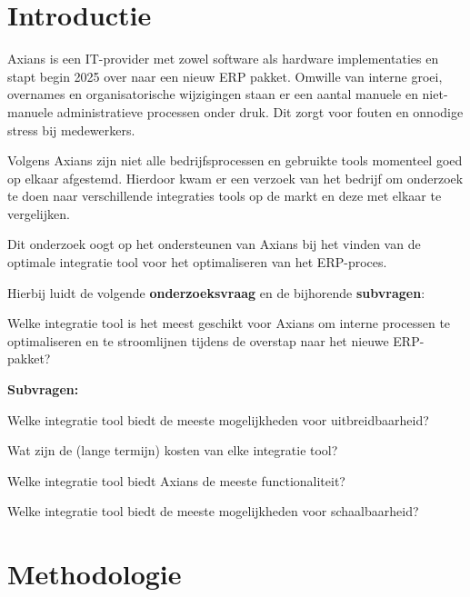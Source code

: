 \documentclass[a0,portrait]{hogent-poster}
\begin{document}
\begin{multicols}{2} %

\section{Introductie}

Axians is een IT-provider met zowel software als hardware implementaties en stapt begin 2025 over naar een nieuw ERP pakket. Omwille van interne groei, overnames en organisatorische wijzigingen staan er een aantal manuele en niet-manuele administratieve processen onder druk. Dit zorgt voor fouten en onnodige stress bij medewerkers. 
\vspace{\baselineskip}

Volgens Axians zijn niet alle bedrijfsprocessen en gebruikte tools momenteel goed op elkaar afgestemd. Hierdoor kwam er een verzoek van het bedrijf om onderzoek te doen naar verschillende integraties tools op de markt en deze met elkaar te vergelijken. 
\vspace{\baselineskip}

Dit onderzoek oogt op het ondersteunen van Axians bij het vinden van de optimale integratie tool voor het optimaliseren van het ERP-proces.

\vspace{\baselineskip}

Hierbij luidt de volgende \textbf{onderzoeksvraag} en de bijhorende \textbf{subvragen}:

\vspace{\baselineskip}

Welke integratie tool is het meest geschikt voor Axians om interne processen te optimaliseren en te stroomlijnen tijdens de overstap naar het nieuwe ERP-pakket?

\vspace{\baselineskip}

\textbf{Subvragen:}

Welke integratie tool biedt de meeste mogelijkheden voor uitbreidbaarheid?

Wat zijn de (lange termijn) kosten van elke integratie tool?

Welke integratie tool biedt Axians de meeste functionaliteit?

Welke integratie tool biedt de meeste mogelijkheden voor schaalbaarheid?


\section{Methodologie}


\end{multicols}
\end{document}
